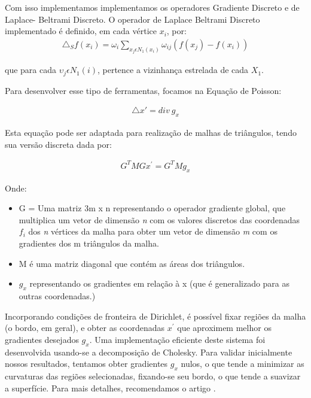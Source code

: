 


Com isso implementamos implementamos os operadores Gradiente Discreto e de Laplace- Beltrami Discreto. O operador de Laplace Beltrami Discreto implementado é definido, em cada vértice $x_i$, por:
\begin{eqnarray}
\triangle_{S}f(x_{i})=\omega_{i} \sum_{x_{j} \epsilon N_{1}(x_i) } \omega_{ij}(f(x_{j}) - f(x_{i}))
\end{eqnarray}

que para cada $\upsilon_{j} \epsilon N_{1}(i)$, pertence a vizinhança estrelada de cada $X_1$.




Para desenvolver esse tipo de ferramentas, focamos na Equação de Poisson:

\begin{eqnarray}
\bigtriangleup x' = div\  \textbf{$g_x$}
\end{eqnarray}

Esta equação pode ser adaptada para realização de malhas de triângulos, tendo sua versão discreta dada por:

\begin{eqnarray}
G^{T}MGx^{'} = G^{T}Mg_{x}
\end{eqnarray}

Onde:

\begin{itemize}
\item G = Uma matriz 3m x n representando o operador gradiente global, que multiplica um vetor de dimensão \textit{n} com os valores discretos das coordenadas $f_i$ dos \textit{n} vértices da malha para obter um vetor de dimensão \textit{m} com os gradientes dos m triângulos da malha.
\item M é uma matriz diagonal que contém as áreas dos triângulos.
\item $g_x$ representando os gradientes em relação à x (que é generalizado para as outras coordenadas.) 
\end{itemize}
Incorporando condições de fronteira de Dirichlet, é possível fixar regiões da malha (o bordo, em geral), e obter as coordenadas $x^{'}$  que aproximem melhor os gradientes desejados $g_x$. 
Uma implementação eficiente deste sistema foi desenvolvida usando-se a decomposição de Cholesky. Para validar inicialmente nossos resultados, tentamos obter gradientes $g_x$ nulos, o que tende a minimizar as curvaturas das regiões selecionadas, fixando-se seu bordo, o que tende a suavizar a superfície. Para mais detalhes, recomendamos o artigo \cite{Olga}.














